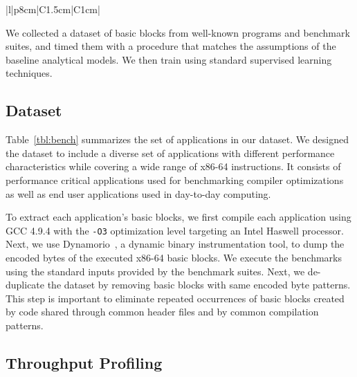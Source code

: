 \begin{table}[ht!]
\begin{center}
\begin{tabular}{ |l|p{8cm}|C{1.5cm}|C{1cm}| }
  \hline
\end{tabular}
  \end{center}
  \vspace{-10pt}
  \caption{Composition of the dataset for Haswell, showing the total number of basic blocks per benchmark as well as the unique number of blocks after de-duplicating repeated blocks on a per-benchmark basis. Note that the \#Unique Blocks on the full dataset is not equal to the sum of unique blocks per individual benchmark, as we de-duplicate across all benchmarks.}
  \label{tbl:bench}
\end{table}


We collected a dataset of basic blocks from well-known programs and benchmark suites, and timed them with a procedure that matches the assumptions of the baseline analytical models.
We then train \tool{} using standard supervised learning techniques.
\subsection{Dataset}
\label{sec:dataset}

Table~\ref{tbl:bench} summarizes the set of applications in our dataset.
We designed the dataset to include a diverse set of applications with different performance characteristics
while covering a wide range of x86-64 instructions.
It consists of performance critical applications used for benchmarking compiler optimizations
as well as end user applications used in day-to-day computing.

To extract each application's basic blocks, we first compile each application using GCC 4.9.4 with the \texttt{-O3} optimization level targeting an Intel Haswell processor. 
Next, we use Dynamorio~\cite{dynamorio}, a dynamic binary instrumentation tool, to dump the encoded bytes of the executed x86-64 basic blocks.
We execute the benchmarks using the standard inputs provided by the benchmark suites.
Next, we de-duplicate the dataset by removing basic blocks with same encoded byte patterns. This step is important to eliminate repeated occurrences of basic blocks created by code shared through common header files and by common compilation patterns.


\subsection{Throughput Profiling}

